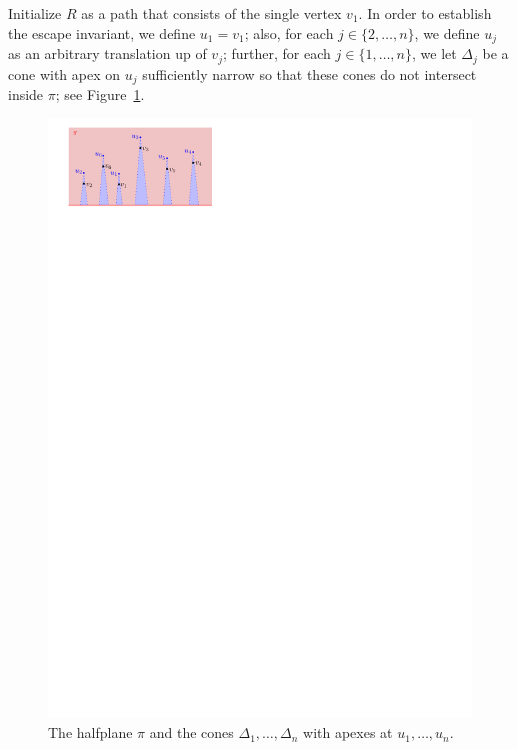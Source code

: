 \documentclass[11pt]{patmorin}
\begin{document}
Initialize $R$ as a path that consists of the single vertex $v_1$. In order to establish the escape invariant, we define $u_1=v_1$; also, for each $j\in \{2,\dots,n\}$, we define $u_j$ as an arbitrary translation up of $v_j$; further, for each $j\in \{1,\dots,n\}$, we let $\Delta_j$ be a cone with apex on $u_j$ sufficiently narrow so that these cones do not intersect inside $\pi$; see Figure~\ref{fig:Escape Invariant}.

\begin{figure}[tb]
\centering 
\includegraphics{img/EscapeInvariant.pdf}
\caption{The halfplane $\pi$ and the cones $\Delta_1,\ldots,\Delta_n$ with apexes at $u_1,\ldots,u_n$.}
\label{fig:Escape Invariant}
\end{figure}

\end{document}
